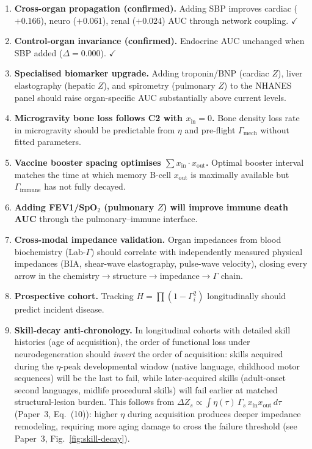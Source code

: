\documentclass[aps,pre,twocolumn,superscriptaddress,floatfix]{revtex4-2}
\begin{document}
\begin{enumerate}
  \item \textbf{Cross-organ propagation (confirmed).}
    Adding SBP improves cardiac ($+0.166$), neuro ($+0.061$),
    renal ($+0.024$) AUC through network coupling.
    $\checkmark$

  \item \textbf{Control-organ invariance (confirmed).}
    Endocrine AUC unchanged when SBP added
    ($\Delta = 0.000$). $\checkmark$

  \item \textbf{Specialised biomarker upgrade.}
    Adding troponin/BNP (cardiac $Z$), liver elastography
    (hepatic $Z$), and spirometry (pulmonary $Z$) to
    the NHANES panel should raise organ-specific AUC
    substantially above current levels.

  \item \textbf{Microgravity bone loss follows C2 with
    $x_{\text{in}} = 0$.}
    Bone density loss rate in microgravity should be
    predictable from $\eta$ and pre-flight
    $\Gamma_{\text{mech}}$ without fitted parameters.

  \item \textbf{Vaccine booster spacing optimises
    $\sum x_{\text{in}} \cdot x_{\text{out}}$.}
    Optimal booster interval matches the time at which
    memory B-cell $x_{\text{out}}$ is maximally
    available but $\Gamma_{\text{immune}}$ has not
    fully decayed.

  \item \textbf{Adding FEV1/SpO$_2$ (pulmonary $Z$)
    will improve immune death AUC}
    through the pulmonary--immune interface.

  \item \textbf{Cross-modal impedance validation.}
    Organ impedances from blood biochemistry (Lab-$\Gamma$)
    should correlate with independently measured physical
    impedances (BIA, shear-wave elastography, pulse-wave
    velocity), closing every arrow in the
    chemistry$\to$structure$\to$impedance$\to\Gamma$ chain.

  \item \textbf{Prospective cohort.}
    Tracking $H = \prod(1-\Gamma_i^2)$ longitudinally
    should predict incident disease.

  \item \textbf{Skill-decay anti-chronology.}
    In longitudinal cohorts with detailed skill histories
    (age of acquisition), the order of functional loss
    under neurodegeneration should \emph{invert} the order
    of acquisition: skills acquired during the $\eta$-peak
    developmental window (native language, childhood motor
    sequences) will be the last to fail, while
    later-acquired skills (adult-onset second languages,
    midlife procedural skills) will fail earlier at matched
    structural-lesion burden.
    This follows from $\Delta Z_s \propto
    \int \eta(\tau)\,\Gamma_s\,x_{\text{in}}
    x_{\text{out}}\,d\tau$
    (Paper~3, Eq.~(10)):
    higher $\eta$ during acquisition produces deeper
    impedance remodeling, requiring more aging damage
    to cross the failure threshold
    (see Paper~3, Fig.~\ref{fig:skill-decay}).


\end{enumerate}
\end{document}
